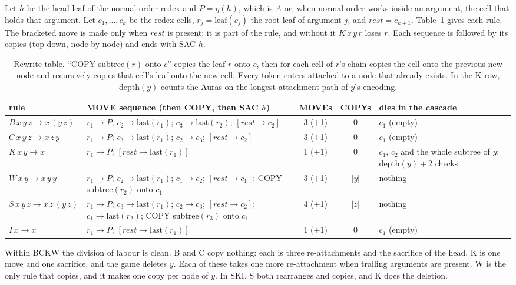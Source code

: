 \documentclass[11pt]{article}
\theoremstyle{definition}
\newcommand{\last}{\mathrm{last}}
\newcommand{\rest}{\mathit{rest}}
\newcommand{\mv}{\to}
\begin{document}
Let $h$ be the head leaf of the normal-order redex and $P = \eta(h)$, which is $A$ or, when
normal order works inside an argument, the cell that holds that argument. Let
$c_1,\dots,c_k$ be the redex cells, $r_j = \mathrm{leaf}(c_j)$ the root leaf of argument
$j$, and $\rest = c_{k+1}$. Table~\ref{tab:rewrite} gives each rule. The bracketed move is
made only when $\rest$ is present; it is part of the rule, and without it $K\,x\,y\,r$
loses $r$. Each sequence is followed by its copies (top-down, node by node) and ends with
SAC $h$.

\begin{table}[t]
\centering\small
\begin{tabularx}{\textwidth}{@{}l>{\raggedright\arraybackslash}Xcc>{\raggedright\arraybackslash}p{3.0cm}@{}}
\toprule
rule & MOVE sequence (then COPY, then SAC $h$) & MOVEs & COPYs & dies in the cascade\\
\midrule
$B\,x\,y\,z \to x\,(y\,z)$ & $r_1\mv P$; $c_2\mv\last(r_1)$; $c_3\mv\last(r_2)$; $[\rest\mv c_2]$ & 3 (+1) & 0 & $c_1$ (empty)\\
$C\,x\,y\,z \to x\,z\,y$ & $r_1\mv P$; $c_3\mv\last(r_1)$; $c_2\mv c_3$; $[\rest\mv c_2]$ & 3 (+1) & 0 & $c_1$ (empty)\\
$K\,x\,y \to x$ & $r_1\mv P$; $[\rest\mv\last(r_1)]$ & 1 (+1) & 0 & $c_1$, $c_2$ and the whole subtree of $y$: $\mathrm{depth}(y)+2$ checks\\
$W\,x\,y \to x\,y\,y$ & $r_1\mv P$; $c_2\mv\last(r_1)$; $c_1\mv c_2$; $[\rest\mv c_1]$; COPY subtree$(r_2)$ onto $c_1$ & 3 (+1) & $|y|$ & nothing\\
\midrule
$S\,x\,y\,z \to x\,z\,(y\,z)$ & $r_1\mv P$; $c_3\mv\last(r_1)$; $c_2\mv c_3$; $[\rest\mv c_2]$; $c_1\mv\last(r_2)$; COPY subtree$(r_3)$ onto $c_1$ & 4 (+1) & $|z|$ & nothing\\
$I\,x \to x$ & $r_1\mv P$; $[\rest\mv\last(r_1)]$ & 1 (+1) & 0 & $c_1$ (empty)\\
\bottomrule
\end{tabularx}
\caption{Rewrite table. ``COPY subtree$(r)$ onto $c$'' copies the leaf $r$ onto $c$, then
for each cell of $r$'s chain copies the cell onto the previous new node and recursively
copies that cell's leaf onto the new cell. Every token enters attached to a node that
already exists. In the K row, $\mathrm{depth}(y)$ counts the Auras on the longest attachment
path of $y$'s encoding.}\label{tab:rewrite}
\end{table}

Within BCKW the division of labour is clean. B and C copy nothing: each is three
re-attachments and the sacrifice of the head. K is one move and one sacrifice, and the
game deletes $y$. Each of these takes one more re-attachment when trailing arguments are
present. W is the only rule that copies, and it makes one copy per node of $y$. In SKI, S both rearranges and copies,
and K does the deletion.
\end{document}
